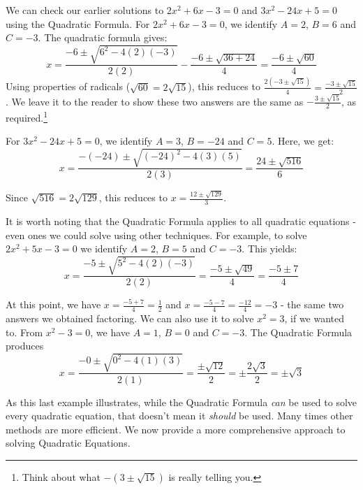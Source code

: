 \documentclass[10pt]{article}
\begin{document}
\medskip

We can check our earlier solutions to $2x^2 + 6x - 3 = 0$ and $3x^2 - 24x + 5 = 0$ using the Quadratic Formula.  For $2x^2 + 6x - 3 = 0$, we identify $A = 2$, $B = 6$ and $C = -3$.  The quadratic formula gives: \[ x = \dfrac{-6 \pm \sqrt{6^2 - 4(2)(-3)}}{2(2)} - \dfrac{-6 \pm \sqrt{36 + 24}}{4} = \dfrac{-6 \pm \sqrt{60}}{4} \] Using properties of radicals ($\sqrt{60} = 2 \sqrt{15}$), this reduces to $\frac{2(-3 \pm \sqrt{15})}{4} =\frac{-3 \pm \sqrt{15}}{2}$. We leave it to the reader to show these two answers are the same as $-\frac{3 \pm \sqrt{15}}{2}$,  as required.\footnote{Think about what $-(3 \pm \sqrt{15})$ is really telling you.}  

\smallskip

For $3x^2 - 24x + 5 = 0$, we identify $A = 3$, $B = -24$ and $C = 5$.  Here, we get: \[ x = \dfrac{-(-24) \pm \sqrt{(-24)^2 - 4(3)(5)}}{2(3)} = \dfrac{24 \pm \sqrt{516}}{6} \]

Since $\sqrt{516} = 2\sqrt{129}$, this reduces to  $x = \frac{12 \pm \sqrt{129}}{3}$. 

\smallskip

It is worth noting that the Quadratic Formula applies to all quadratic equations - even ones we could solve using other techniques.  For example, to solve $2x^2 + 5x - 3 = 0$  we identify $A = 2$, $B = 5$ and $C = -3$.  This yields: \[ x = \dfrac{-5 \pm \sqrt{5^2 - 4(2)(-3)}}{2(2)} = \dfrac{-5 \pm \sqrt{49}}{4} = \dfrac{-5 \pm 7}{4} \]

At this point, we have $x = \frac{-5+7}{4} = \frac{1}{2}$ and $x = \frac{-5-7}{4} = \frac{-12}{4} = -3$ - the same two answers we obtained factoring.  We can also use it to solve $x^2 = 3$, if we wanted to.  From $x^2 -3 = 0$, we have $A = 1$, $B = 0$ and $C = -3$.  The Quadratic Formula produces \[ x = \dfrac{-0 \pm \sqrt{0^2 - 4(1)(3)}}{2(1)} = \dfrac{\pm\sqrt{12}}{2} = \pm \dfrac{2\sqrt{3}}{2} = \pm \sqrt{3}\]

As this last example illustrates, while the  Quadratic Formula \textit{can} be used to solve every quadratic equation, that doesn't mean it \textit{should} be used.  Many times other methods are more efficient.  We now provide a more comprehensive approach to solving Quadratic Equations.  

\medskip

\label{solvequadraticeqns}
\end{document}
